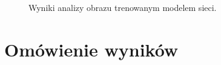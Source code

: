 \begin{figure}[H]
\hfill
\caption{Wyniki analizy obrazu trenowanym modelem sieci.}
\label{fig:dziura}
\end{figure}

\section{Omówienie wyników}